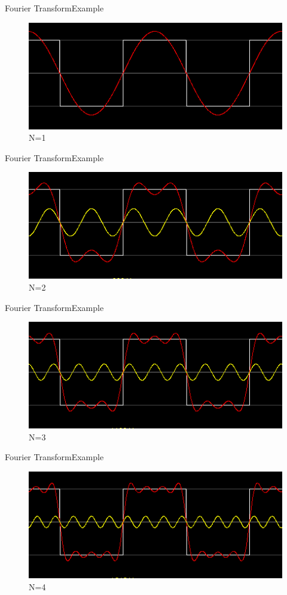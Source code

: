 \documentclass{beamer}
\begin{document}
\begin{frame}{Fourier Transform}{Example}
\begin{figure}
\includegraphics[scale=0.75]{images/image19.png}
\caption{N=1}
\end{figure}
\end{frame}

\begin{frame}{Fourier Transform}{Example}
\begin{figure}
\includegraphics[scale=0.75]{images/image20.png}
\caption{N=2}
\end{figure}
\end{frame}

\begin{frame}{Fourier Transform}{Example}
\begin{figure}
\includegraphics[scale=0.75]{images/image21.png}
\caption{N=3}
\end{figure}
\end{frame}

\begin{frame}{Fourier Transform}{Example}
\begin{figure}
\includegraphics[scale=0.75]{images/image22.png}
\caption{N=4}
\end{figure}
\end{frame}
\end{document}
